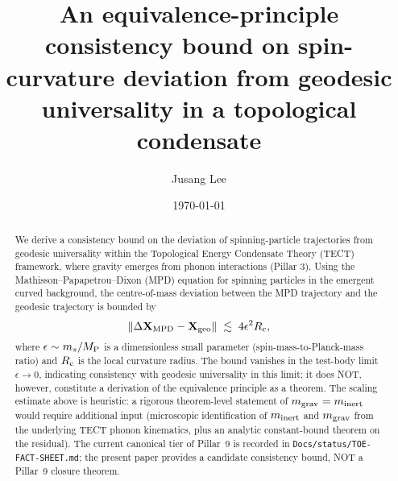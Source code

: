 



\title{An equivalence-principle consistency bound on spin-curvature
deviation from geodesic universality in a topological condensate}

\author{Jusang Lee}

\date{\today}

\begin{abstract}
We derive a consistency bound on the deviation of spinning-particle
trajectories from geodesic universality within the Topological Energy
Condensate Theory (TECT) framework, where gravity emerges from
phonon interactions (Pillar 3). Using the
Mathisson--Papapetrou--Dixon (MPD) equation for spinning particles
in the emergent curved background, the centre-of-mass deviation
between the MPD trajectory and the geodesic trajectory is bounded by
\[
\| \Delta \mathbf{X}_{\rm MPD} - \mathbf{X}_{\rm geo} \|
\;\lesssim\; 4 \epsilon^2 R_{\rm c},
\]
where $\epsilon \sim m_s / M_{\rm P}$ is a dimensionless small
parameter (spin-mass-to-Planck-mass ratio) and $R_{\rm c}$ is the
local curvature radius. The bound vanishes in the test-body limit
$\epsilon \to 0$, indicating consistency with geodesic universality
in this limit; it does NOT, however, constitute a derivation of the
equivalence principle as a theorem. The scaling estimate above is
heuristic: a rigorous theorem-level statement of
$m_{\rm grav} = m_{\rm inert}$ would require additional input
(microscopic identification of $m_{\rm inert}$ and $m_{\rm grav}$
from the underlying TECT phonon kinematics, plus an analytic
constant-bound theorem on the residual). The current canonical tier
of Pillar~9 is recorded in
\texttt{Docs/status/TOE-FACT-SHEET.md}; the present paper provides
a candidate consistency bound, NOT a Pillar~9 closure theorem.
\end{abstract}

